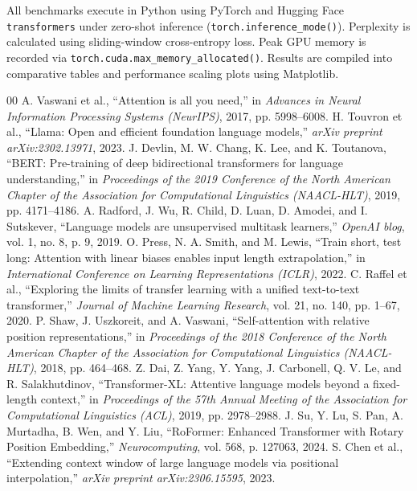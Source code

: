 \documentclass[conference]{IEEEtran}
\begin{document}
All benchmarks execute in Python using PyTorch and Hugging Face \texttt{transformers} under zero-shot inference (\texttt{torch.inference\_mode()}). Perplexity is calculated using sliding-window cross-entropy loss. Peak GPU memory is recorded via \texttt{torch.cuda.max\_memory\_allocated()}. Results are compiled into comparative tables and performance scaling plots using Matplotlib.
\begin{thebibliography}{00}
 A. Vaswani et al., ``Attention is all you need,'' in \emph{Advances in Neural Information Processing Systems (NeurIPS)}, 2017, pp. 5998--6008.
 H. Touvron et al., ``Llama: Open and efficient foundation language models,'' \emph{arXiv preprint arXiv:2302.13971}, 2023.
 J. Devlin, M. W. Chang, K. Lee, and K. Toutanova, ``BERT: Pre-training of deep bidirectional transformers for language understanding,'' in \emph{Proceedings of the 2019 Conference of the North American Chapter of the Association for Computational Linguistics (NAACL-HLT)}, 2019, pp. 4171--4186.
 A. Radford, J. Wu, R. Child, D. Luan, D. Amodei, and I. Sutskever, ``Language models are unsupervised multitask learners,'' \emph{OpenAI blog}, vol. 1, no. 8, p. 9, 2019.
 O. Press, N. A. Smith, and M. Lewis, ``Train short, test long: Attention with linear biases enables input length extrapolation,'' in \emph{International Conference on Learning Representations (ICLR)}, 2022.
 C. Raffel et al., ``Exploring the limits of transfer learning with a unified text-to-text transformer,'' \emph{Journal of Machine Learning Research}, vol. 21, no. 140, pp. 1--67, 2020.
 P. Shaw, J. Uszkoreit, and A. Vaswani, ``Self-attention with relative position representations,'' in \emph{Proceedings of the 2018 Conference of the North American Chapter of the Association for Computational Linguistics (NAACL-HLT)}, 2018, pp. 464--468.
 Z. Dai, Z. Yang, Y. Yang, J. Carbonell, Q. V. Le, and R. Salakhutdinov, ``Transformer-XL: Attentive language models beyond a fixed-length context,'' in \emph{Proceedings of the 57th Annual Meeting of the Association for Computational Linguistics (ACL)}, 2019, pp. 2978--2988.
 J. Su, Y. Lu, S. Pan, A. Murtadha, B. Wen, and Y. Liu, ``RoFormer: Enhanced Transformer with Rotary Position Embedding,'' \emph{Neurocomputing}, vol. 568, p. 127063, 2024.
 S. Chen et al., ``Extending context window of large language models via positional interpolation,'' \emph{arXiv preprint arXiv:2306.15595}, 2023.

\end{thebibliography}
\end{document}

